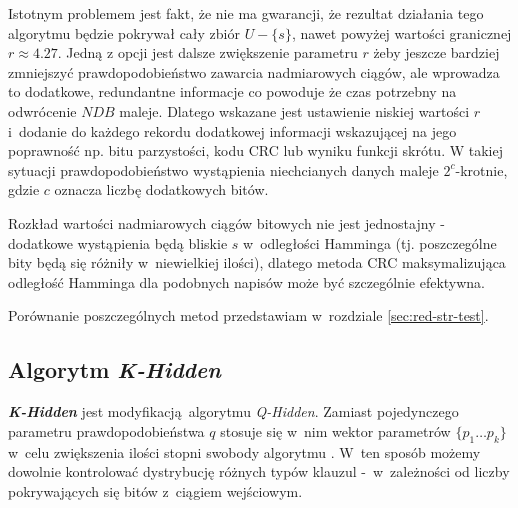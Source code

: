 Istotnym problemem jest fakt, że nie ma gwarancji, że rezultat działania tego algorytmu będzie pokrywał cały zbiór $U - \{s\}$,
nawet powyżej wartości granicznej $r \approx 4.27$. Jedną z opcji jest dalsze zwiększenie parametru $r$ żeby jeszcze 
bardziej zmniejszyć prawdopodobieństwo zawarcia nadmiarowych ciągów, ale wprowadza to dodatkowe, redundantne informacje co powoduje
że czas potrzebny na odwrócenie $NDB$ maleje. Dlatego wskazane jest  ustawienie niskiej wartości $r$ i~dodanie do każdego rekordu 
dodatkowej informacji wskazującej na jego poprawność np. bitu parzystości, kodu CRC lub wyniku funkcji skrótu.
W takiej sytuacji prawdopodobieństwo wystąpienia niechcianych danych maleje $2^{c}$-krotnie, gdzie $c$ oznacza liczbę dodatkowych bitów.

Rozkład wartości nadmiarowych ciągów bitowych nie jest jednostajny - dodatkowe wystąpienia będą bliskie $s$ w~odległości Hamminga
(tj. poszczególne bity będą się różniły w~niewielkiej ilości), dlatego metoda CRC maksymalizująca odległość Hamminga 
dla podobnych napisów może być szczególnie efektywna. \cite{HARD-NDB}

Porównanie poszczególnych metod przedstawiam w~rozdziale \ref{sec:red-str-test}.

\subsection{Algorytm \textit{K-Hidden}}
\textbf{\textit{K-Hidden}} jest modyfikacją algorytmu \textit{Q-Hidden}. Zamiast pojedynczego parametru prawdopodobieństwa $q$ stosuje się w~nim
wektor parametrów $\{p_1 \dots p_k\}$ w~celu zwiększenia ilości stopni swobody algorytmu \cite{k-hidden}. W~ten sposób możemy dowolnie kontrolować dystrybucję
różnych typów klauzul -~w~zależności od liczby pokrywających się bitów z~ciągiem wejściowym.
\\



